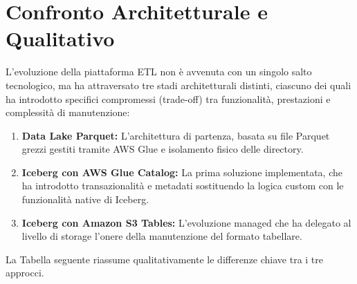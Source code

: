 \documentclass[12pt,a4paper,openright,twoside]{book}
\begin{document}
\section{Confronto Architetturale e Qualitativo}
L'evoluzione della piattaforma ETL non è avvenuta con un singolo salto tecnologico, ma ha attraversato tre stadi architetturali distinti, ciascuno dei quali ha introdotto specifici compromessi (trade-off) tra funzionalità, prestazioni e complessità di manutenzione:

\begin{enumerate}
    \item \textbf{Data Lake Parquet:} L'architettura di partenza, basata su file Parquet grezzi gestiti tramite AWS Glue e isolamento fisico delle directory.
    \item \textbf{Iceberg con AWS Glue Catalog:} La prima soluzione implementata, che ha introdotto transazionalità e metadati sostituendo la logica custom con le funzionalità native di Iceberg.
    \item \textbf{Iceberg con Amazon S3 Tables:} L'evoluzione managed che ha delegato al livello di storage l'onere della manutenzione del formato tabellare.
\end{enumerate}

La Tabella seguente riassume qualitativamente le differenze chiave tra i tre approcci.
\end{document}
